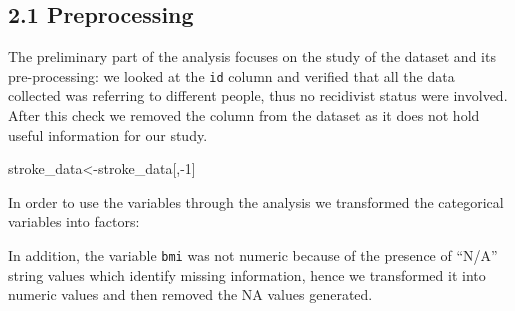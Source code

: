 \documentclass[
]{article}
\newenvironment{Shaded}{\begin{snugshade}}{\end{snugshade}}
\newcommand{\DecValTok}[1]{\textcolor[rgb]{0.00,0.00,0.81}{#1}}
\newcommand{\FunctionTok}[1]{\textcolor[rgb]{0.00,0.00,0.00}{#1}}
\newcommand{\NormalTok}[1]{#1}
\newcommand{\OtherTok}[1]{\textcolor[rgb]{0.56,0.35,0.01}{#1}}
\newcommand{\SpecialCharTok}[1]{\textcolor[rgb]{0.00,0.00,0.00}{#1}}
\begin{document}
\hypertarget{preprocessing}{%
\subsection{2.1 Preprocessing}\label{preprocessing}}

The preliminary part of the analysis focuses on the study of the dataset
and its pre-processing: we looked at the \texttt{id} column and verified
that all the data collected was referring to different people, thus no
recidivist status were involved. After this check we removed the column
from the dataset as it does not hold useful information for our study.

\begin{Shaded}
\begin{Highlighting}[]
\NormalTok{stroke\_data}\OtherTok{\textless{}{-}}\NormalTok{stroke\_data[,}\SpecialCharTok{{-}}\DecValTok{1}\NormalTok{]}
\end{Highlighting}
\end{Shaded}

In order to use the variables through the analysis we transformed the
categorical variables into factors:

\begin{Shaded}
\end{Shaded}

In addition, the variable \texttt{bmi} was not numeric because of the
presence of ``N/A'' string values which identify missing information,
hence we transformed it into numeric values and then removed the NA
values generated.
\end{document}
